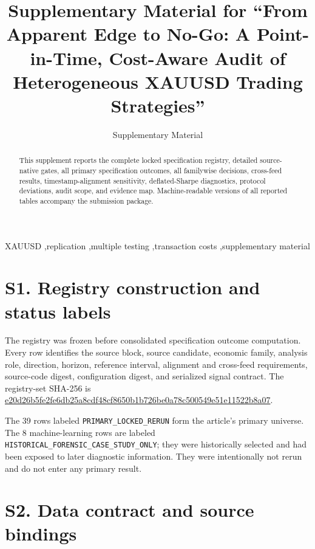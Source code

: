 \documentclass[a4paper,fleqn]{cas-sc}
\begin{document}
\title[mode=title]{Supplementary Material for ``From Apparent Edge to No-Go: A Point-in-Time, Cost-Aware Audit of Heterogeneous XAUUSD Trading Strategies''}
\author[1]{Supplementary Material}

\begin{abstract}
This supplement reports the complete locked specification registry, detailed source-native gates, all primary specification outcomes, all familywise decisions, cross-feed results, timestamp-alignment sensitivity, deflated-Sharpe diagnostics, protocol deviations, audit scope, and evidence map. Machine-readable versions of all reported tables accompany the submission package.
\end{abstract}
\begin{keywords}
XAUUSD \sep replication \sep multiple testing \sep transaction costs \sep supplementary material
\end{keywords}
\maketitle

\section*{S1. Registry construction and status labels}

The registry was frozen before consolidated specification outcome computation. Every row identifies the source block, source candidate, economic family, analysis role, direction, horizon, reference interval, alignment and cross-feed requirements, source-code digest, configuration digest, and serialized signal contract. The registry-set SHA-256 is \url{e20d26b5fe2fe6db25a8cdf48cf8650b1b726be0a78c500549e51e11522b8a07}.

The 39 rows labeled \texttt{PRIMARY\_LOCKED\_RERUN} form the article's primary universe. The 8 machine-learning rows are labeled \texttt{HISTORICAL\_FORENSIC\_CASE\_STUDY\_ONLY}; they were historically selected and had been exposed to later diagnostic information. They were intentionally not rerun and do not enter any primary result.



\section*{S2. Data contract and source bindings}
\end{document}

